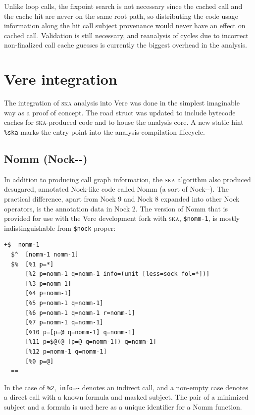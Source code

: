 \documentclass[twoside]{article}
\begin{document}
Unlike loop calls, the fixpoint search is not necessary since the cached call and the cache hit are never on the same root path, so distributing the code usage information along the hit call subject provenance would never have an effect on cached call.  Validation is still necessary, and reanalysis of cycles due to incorrect non-finalized call cache guesses is currently the biggest overhead in the analysis.

\section{Vere integration}

The integration of \textsc{ska} analysis into Vere was done in the simplest imaginable way as a proof of concept.  The road struct was updated to include bytecode caches for \textsc{ska}-produced code and to house the analysis core.  A new static hint \lstinline[style=inlinecode]{%ska} marks the entry point into the analysis-compilation lifecycle.

\subsection{Nomm (Nock-{}-)}

In addition to producing call graph information, the \textsc{ska} algorithm also produced desugared, annotated Nock-like code called Nomm (a sort of Nock-{}-).  The practical difference, apart from Nock 9 and Nock 8 expanded into other Nock operators, is the annotation data in Nock 2.  The version of Nomm that is provided for use with the Vere development fork with \textsc{ska}, \lstinline[style=inlinecode]{$nomm-1}, is mostly indistinguishable from \lstinline[style=inlinecode]{$nock} proper:

\begin{lstlisting}[style=listingblock,numbers=none]
+$  nomm-1
  $^  [nomm-1 nomm-1]
  $%  [%1 p=*]
      [%2 p=nomm-1 q=nomm-1 info=(unit [less=sock fol=*])]
      [%3 p=nomm-1]
      [%4 p=nomm-1]
      [%5 p=nomm-1 q=nomm-1]
      [%6 p=nomm-1 q=nomm-1 r=nomm-1]
      [%7 p=nomm-1 q=nomm-1]
      [%10 p=[p=@ q=nomm-1] q=nomm-1]
      [%11 p=$@(@ [p=@ q=nomm-1]) q=nomm-1]
      [%12 p=nomm-1 q=nomm-1]
      [%0 p=@]
  ==
\end{lstlisting}

\noindent
In the case of \lstinline[style=inlinecode]{%2}, \lstinline[style=inlinecode]{info=~} denotes an indirect call, and a non-empty case denotes a direct call with a known formula and masked subject.  The pair of a minimized subject and a formula is used here as a unique identifier for a Nomm function.
\end{document}
